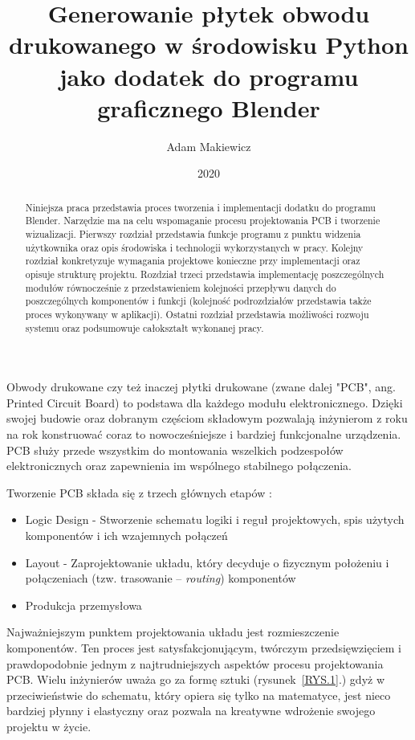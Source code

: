 \documentclass[brudnopis]{xmgr}
\author   {Adam Makiewicz}
\title    {Generowanie płytek obwodu drukowanego w środowisku Python jako dodatek do programu graficznego Blender}
\date     {2020}
\begin{document}
\begin{abstract}
Niniejsza praca przedstawia proces tworzenia i implementacji dodatku do programu Blender. Narzędzie ma na celu wspomaganie procesu projektowania PCB i tworzenie wizualizacji. Pierwszy rozdział przedstawia funkcje programu z punktu widzenia użytkownika oraz opis środowiska i technologii wykorzystanych w pracy.
Kolejny rozdział konkretyzuje wymagania projektowe konieczne przy implementacji oraz opisuje strukturę projektu.
Rozdział trzeci przedstawia implementację poszczególnych modułów równocześnie z przedstawieniem kolejności przepływu danych do poszczególnych komponentów i funkcji (kolejność podrozdziałów przedstawia także proces wykonywany w aplikacji). Ostatni rozdział przedstawia możliwości rozwoju systemu oraz podsumowuje całokształt wykonanej pracy. 

\end{abstract}



\maketitle

\introduction

Obwody drukowane czy też inaczej płytki drukowane (zwane dalej "PCB", ang. Printed Circuit Board) to podstawa dla każdego modułu elektronicznego. Dzięki swojej budowie oraz dobranym częściom składowym pozwalają inżynierom z roku na rok konstruować coraz to nowocześniejsze i bardziej funkcjonalne urządzenia. PCB służy przede wszystkim do montowania wszelkich podzespołów elektronicznych oraz zapewnienia im wspólnego stabilnego połączenia.

\vspace{5mm}
Tworzenie PCB składa się z trzech głównych etapów \cite{Abboud}:

\begin{itemize}
\item
Logic Design - Stworzenie schematu logiki i reguł projektowych, spis użytych komponentów i ich wzajemnych połączeń
\item
Layout - Zaprojektowanie układu, który decyduje o fizycznym położeniu i połączeniach (tzw. trasowanie -- \emph{routing}) komponentów
\item
Produkcja przemysłowa
\end{itemize}
    
    Najważniejszym punktem projektowania układu jest rozmieszczenie komponentów. Ten proces jest satysfakcjonującym, twórczym przedsięwzięciem i prawdopodobnie jednym z najtrudniejszych aspektów procesu projektowania PCB. Wielu inżynierów uważa go za formę sztuki (rysunek~\ref{RYS.1}.) gdyż w przeciwieństwie do schematu, który opiera się tylko na matematyce, jest nieco bardziej płynny i elastyczny oraz pozwala na kreatywne wdrożenie swojego projektu w życie.
\end{document}
